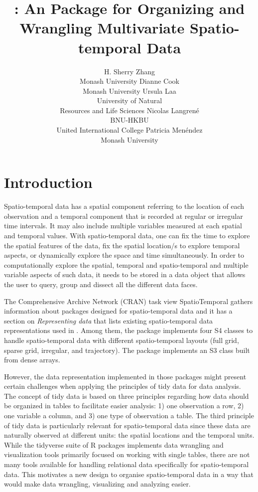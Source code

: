 \documentclass[
  shortnames]{jss}
\author{
H. Sherry Zhang\\Monash University \And Dianne Cook\\Monash University \And Ursula Laa\\University of Natural \\ Resources and Life Sciences \AND Nicolas Langrené\\BNU-HKBU \\ United International College \And Patricia Menéndez\\Monash University
}
\title{\pkg{cubble}: An \proglang{R} Package for Organizing and Wrangling Multivariate Spatio-temporal Data}
\begin{document}
\hypertarget{introduction}{%
\section{Introduction}\label{introduction}}

Spatio-temporal data has a spatial component referring to the location of each observation and a temporal component that is recorded at regular or irregular time intervals. It may also include multiple variables measured at each spatial and temporal values. With spatio-temporal data, one can fix the time to explore the spatial features of the data, fix the spatial location/s to explore temporal aspects, or dynamically explore the space and time simultaneously.
In order to computationally explore the spatial, temporal and spatio-temporal and multiple variable aspects of such data, it needs to be stored in a data object that allows the user to query, group and dissect all the different data faces.

The Comprehensive  Archive Network (CRAN) task view SpatioTemporal \citep{ctvspatiotemporal} gathers information about  packages designed for spatio-temporal data and it has a section on \emph{Representing data} that lists existing spatio-temporal data representations used in . Among them, the  package \citep{spacetime} implements four S4 classes to handle spatio-temporal data with different spatio-temporal layouts (full grid, sparse grid, irregular, and trajectory). The  package \citep{stars} implements an S3 class built from dense arrays.

However, the data representation implemented in those packages might present certain challenges when applying the principles of tidy data \citep{tidydata} for data analysis. The concept of tidy data is based on three principles regarding how data should be organized in tables to facilitate easier analysis: 1) one observation a row, 2) one variable a column, and 3) one type of observation a table. The third principle of tidy data is particularly relevant for spatio-temporal data since these data are naturally observed at different units: the spatial locations and the temporal units. While the tidyverse suite of R packages implements data wrangling and visualization tools primarily focused on working with single tables, there are not many tools available for handling relational data specifically for spatio-temporal data. This motivates a new design to organise spatio-temporal data in a way that would make data wrangling, visualizing and analyzing easier.
\end{document}
